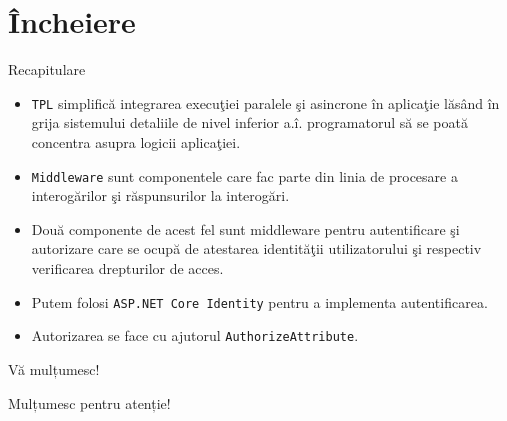 \documentclass[presentation]{beamer}
\begin{document}
\section{Încheiere}
\label{sec:org454c202}
\begin{frame}[label={sec:orga5f0959},fragile]{Recapitulare}
 \begin{itemize}
\item \texttt{TPL} simplifică integrarea execuţiei paralele şi asincrone în aplicaţie lăsând în grija sistemului detaliile de nivel inferior a.î. programatorul să se poată concentra asupra logicii aplicaţiei.
\item \texttt{Middleware} sunt componentele care fac parte din linia de procesare a interogărilor şi răspunsurilor la interogări.
\item Două componente de acest fel sunt middleware pentru autentificare şi autorizare care se ocupă de atestarea identităţii utilizatorului şi respectiv verificarea drepturilor de acces.
\item Putem folosi \texttt{ASP.NET Core Identity} pentru a implementa autentificarea.
\item Autorizarea se face cu ajutorul \texttt{AuthorizeAttribute}.
\end{itemize}
\end{frame}
\begin{frame}[label={sec:org4525123}]{Vă mulțumesc!}
\begin{center}
Mulțumesc pentru atenție!
\end{center}
\end{frame}
\end{document}
